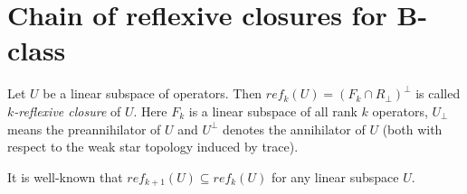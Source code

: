 \documentclass[12pt]{amsart}
\theoremstyle{case}
\begin{document}


\section{Chain of reflexive closures for B-class}
  \begin{definition}
    Let $U$ be a linear subspace of operators.
    Then $ref_k(U) = (F_k \cap R_\perp)^{\perp}$ is called \emph{$k$-reflexive closure} of $U$.
    Here $F_k$ is a linear subspace of all rank $k$ operators, $U_\perp$ means the preannihilator of $U$ and
      $U^\perp$ denotes the annihilator of $U$ (both with respect to the weak star topology induced by trace).
  \end{definition}
  It is well-known that $ref_{k + 1}(U) \subseteq ref_k(U)$ for any linear subspace $U$.
\end{document}

